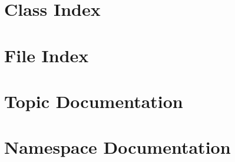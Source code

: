 \documentclass[twoside]{book}
\newcommand{\+}{\discretionary{\mbox{\scriptsize$\hookleftarrow$}}{}{}}
\begin{document}
\chapter{Class Index}

\chapter{File Index}

\chapter{Topic Documentation}







\chapter{Namespace Documentation}



\end{document}
